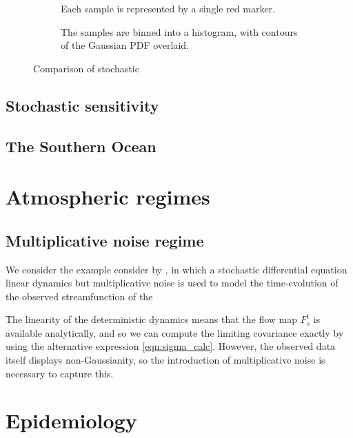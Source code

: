\begin{figure}
	\begin{center}
		\begin{subfigure}{0.8\textwidth}
			\caption{Each sample is represented by a single red marker.}
			\label{fig:}
		\end{subfigure}
		\begin{subfigure}{0.8\textwidth}
			\caption{The samples are binned into a histogram, with contours of the Gaussian PDF overlaid.}
			\label{fig:}
		\end{subfigure}
		\caption{Comparison of stochastic}
	\end{center}
\end{figure}




\subsection{Stochastic sensitivity}



\subsection{The Southern Ocean}

\section{Atmospheric regimes}


\subsection{Multiplicative noise regime}


We consider the example consider by \citet{SuraEtAl_2005_MultiplicativeNoiseNonGaussianity}, in which a stochastic differential equation linear dynamics but multiplicative noise is used to model the time-evolution of the observed streamfunction of the

The linearity of the deterministic dynamics means that the flow map \(F_s^t\) is available analytically, and so we can compute the limiting covariance exactly by using the alternative expression \eqref{eqn:sigma_calc}.
However, the observed data itself displays non-Gaussianity, so the introduction of multiplicative noise is necessary to capture this.




\section{Epidemiology}
